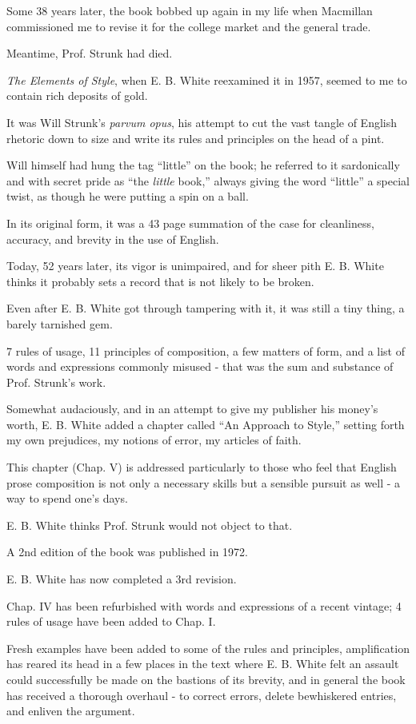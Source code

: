 \documentclass{article}
\begin{document}
Some 38 years later, the book bobbed up again in my life when Macmillan commissioned me to revise it for the college market and the general trade.

Meantime, Prof. Strunk had died.

%
{\it The Elements of Style}, when E. B. White reexamined it in 1957, seemed to me to contain rich deposits of gold.

It was Will Strunk's {\it parvum opus}, his attempt to cut the vast tangle of English rhetoric down to size and write its rules and principles on the head of a pint.

Will himself had hung the tag ``little'' on the book; he referred to it sardonically and with secret pride as ``the {\it little} book,'' always giving the word ``little'' a special twist, as though he were putting a spin on a ball.

In its original form, it was a 43 page summation of the case for cleanliness, accuracy, and brevity in the use of English.

Today, 52 years later, its vigor is unimpaired, and for sheer pith E. B. White thinks it probably sets a record that is not likely to be broken.

Even after E. B. White got through tampering with it, it was still a tiny thing, a barely tarnished gem.

7 rules of usage, 11 principles of composition, a few matters of form, and a list of words and expressions commonly misused - that was the sum and substance of Prof. Strunk's work.

Somewhat audaciously, and in an attempt to give my publisher his money's worth, E. B. White added a chapter called ``An Approach to Style,'' setting forth my own prejudices, my notions of error, my articles of faith.

This chapter (Chap. V) is addressed particularly to those who feel that English prose composition is not only a necessary skills but a sensible pursuit as well - a way to spend one's days.

E. B. White thinks Prof. Strunk would not object to that.

%
A 2nd edition of the book was published in 1972.

E. B. White has now completed a 3rd revision.

Chap. IV has been refurbished with words and expressions of a recent vintage; 4 rules of usage have been added to Chap. I.

Fresh examples have been added to some of the rules and principles, amplification has reared its head in a few places in the text where E. B. White felt an assault could successfully be made on the bastions of its brevity, and in general the book has received a thorough overhaul - to correct errors, delete bewhiskered entries, and enliven the argument.
\end{document}
